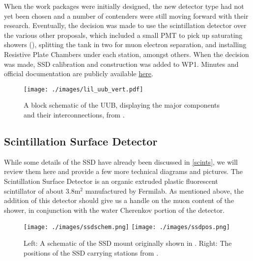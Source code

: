 When the work packages were initially designed, the new detector type had not yet been chosen and a number of contenders were still moving forward with their research. Eventually, the decision was made to use the scintillation detector over the various other proposals, which included a small PMT to pick up saturating showers (\cite{dynrang}), splitting the tank in two for muon electron separation, and installing Resistive Plate Chambers under each station, amongst others. When the decision was made, SSD calibration and construction was added to WP1. Minutes and official documentation are publicly available \href{https://atrium.in2p3.fr/nuxeo/nxpath/default/Atrium/sections/Public/Projet%20AUGER/Test@view_documents?tabIds=%3A&conversationId=0NXMAIN1}{here}.

\begin{figure}[hp]
\centering
\texttt{[image: ./images/lil\_uub\_vert.pdf]}
\caption[UUB Block Schematic]{A block schematic of the UUB, displaying the major components and their interconnections, from \textcite{tiina}.}
\label{uubschem}
\end{figure}

\newpage
\subsection{Scintillation Surface Detector}
\label{ssd}
While some details of the SSD have already been discussed in \autoref{scints}, we will review them here and provide a few more technical diagrams and pictures. The Scintillation Surface Detector is an organic extruded plastic fluorescent scintillator of about 3.8m$^2$ manufactured by Fermilab. As mentioned above, the addition of this detector should give us a handle on the muon content of the shower, in conjunction with the water Cherenkov portion of the detector. 

\begin{figure}[h!]
\begin{center}
\texttt{[image: ./images/ssdschem.png]}
\texttt{[image: ./images/ssdpos.png]}
\caption[AugerPrime SSD Mount and Station Positions]{Left: A schematic of the SSD mount originally shown in \textcite{augerscint}. Right: The positions of the SSD carrying stations from \textcite{firstdat}.}
\label{scintdiag2}
\end{center}
\end{figure}

